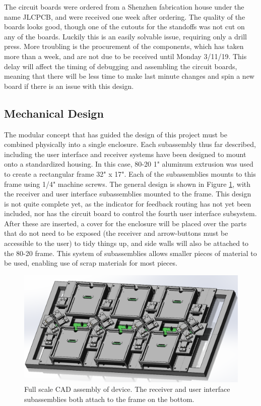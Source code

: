 \documentclass{article}
\begin{document}
	The circuit boards were ordered from a Shenzhen fabrication house under the name JLCPCB, and were received one week after ordering.  The quality of the boards looks good, though one of the cutouts for the standoffs was not cut on any of the boards.  Luckily this is an easily solvable issue, requiring only a drill press.  More troubling is the procurement of the components, which has taken more than a week, and are not due to be received until Monday 3/11/19.  This delay will affect the timing of debugging and assembling the circuit boards, meaning that there will be less time to make last minute changes and spin a new board if there is an issue with this design.

	\subsection{Mechanical Design}

	The modular concept that has guided the design of this project must be combined physically into a single enclosure.  Each subassembly thus far described, including the user interface and receiver systems have been designed to mount onto a standardized housing.  In this case, 80-20 1" aluminum extrusion was used to create a rectangular frame 32" x 17".  Each of the subassemblies mounts to this frame using 1/4" machine screws.  The general design is shown in Figure \ref{fig:fullASM}, with the receiver and user interface subassemblies mounted to the frame.  This design is not quite complete yet, as the indicator for feedback routing has not yet been included, nor has the circuit board to control the fourth user interface subsystem.  After these are inserted, a cover for the enclosure will be placed over the parts that do not need to be exposed (the receiver and arrow-buttons must be accessible to the user) to tidy things up, and side walls will also be attached to the 80-20 frame.  This system of subassemblies allows smaller pieces of material to be used, enabling use of scrap materials for most pieces.  

	\begin{figure}
		\centering
		\includegraphics[width = \textwidth]{PR5Images/FullAsmCAD.png}
		\caption{Full scale CAD assembly of device.  The receiver and user interface subassemblies both attach to the frame on the bottom.}
		\label{fig:fullASM}
	\end{figure}
\end{document}
